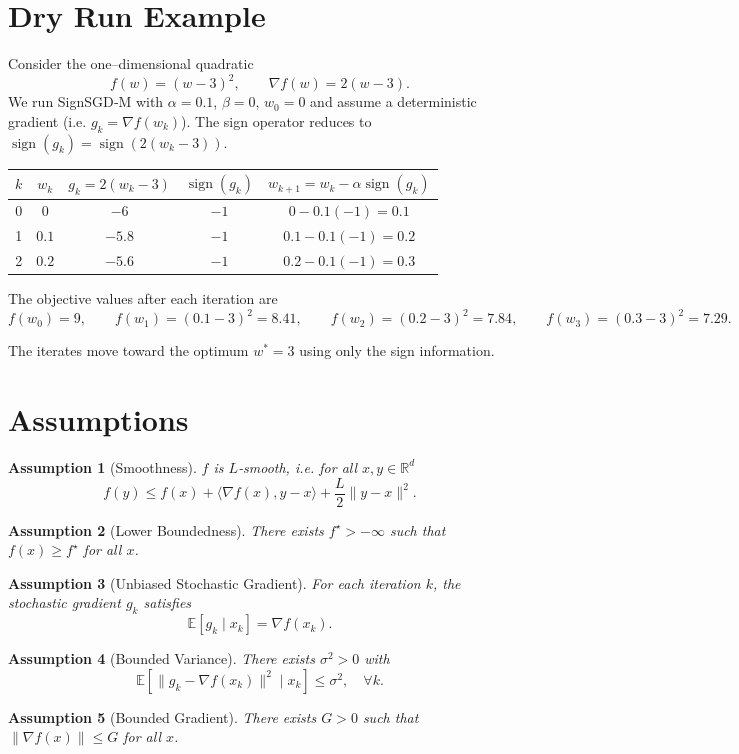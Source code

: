 \documentclass{article}
\newtheorem{assumption}{Assumption}
\newcommand{\sign}{\operatorname{sign}}
\newcommand{\E}{\mathbb{E}}
\newcommand{\R}{\mathbb{R}}
\begin{document}
\section*{Dry Run Example}
Consider the one–dimensional quadratic 
\[
f(w) = (w-3)^{2},
\qquad \nabla f(w)=2(w-3).
\]
We run SignSGD‑M with $\alpha=0.1$, $\beta=0$, $w_{0}=0$ and assume a deterministic gradient (i.e. $g_{k}=\nabla f(w_{k})$).  
The sign operator reduces to $\sign(g_{k})=\operatorname{sign}(2(w_{k}-3))$.

\begin{center}
\begin{tabular}{c|c|c|c|c}
$k$ & $w_{k}$ & $g_{k}=2(w_{k}-3)$ & $\sign(g_{k})$ & $w_{k+1}=w_{k}-\alpha\sign(g_{k})$ \\ \hline
0 & $0$ & $-6$ & $-1$ & $0-0.1(-1)=0.1$ \\
1 & $0.1$ & $-5.8$ & $-1$ & $0.1-0.1(-1)=0.2$ \\
2 & $0.2$ & $-5.6$ & $-1$ & $0.2-0.1(-1)=0.3$
\end{tabular}
\end{center}

The objective values after each iteration are
\[
f(w_{0})=9,\qquad f(w_{1})=(0.1-3)^{2}=8.41,\qquad f(w_{2})=(0.2-3)^{2}=7.84,\qquad f(w_{3})=(0.3-3)^{2}=7.29.
\]

The iterates move toward the optimum $w^{*}=3$ using only the sign information.

\section*{Assumptions}
\label{sec:assumptions}
\begin{assumption}[Smoothness]\label{as:smooth}
$f$ is $L$‑smooth, i.e. for all $x,y\in\R^{d}$
\[
f(y)\le f(x)+\langle\nabla f(x),y-x\rangle+\frac{L}{2}\|y-x\|^{2}.
\]
\end{assumption}
\begin{assumption}[Lower Boundedness]\label{as:lb}
There exists $f^{\star}>-\infty$ such that $f(x)\ge f^{\star}$ for all $x$.
\end{assumption}
\begin{assumption}[Unbiased Stochastic Gradient]\label{as:unbiased}
For each iteration $k$, the stochastic gradient $g_{k}$ satisfies
\[
\E[g_{k}\mid x_{k}] = \nabla f(x_{k}).
\]
\end{assumption}
\begin{assumption}[Bounded Variance]\label{as:variance}
There exists $\sigma^{2}>0$ with
\[
\E\!\left[\|g_{k}-\nabla f(x_{k})\|^{2}\mid x_{k}\right]\le\sigma^{2},
\quad\forall k.
\]
\end{assumption}
\begin{assumption}[Bounded Gradient]\label{as:boundedgrad}
There exists $G>0$ such that $\|\nabla f(x)\|\le G$ for all $x$.
\end{assumption}
\end{document}
